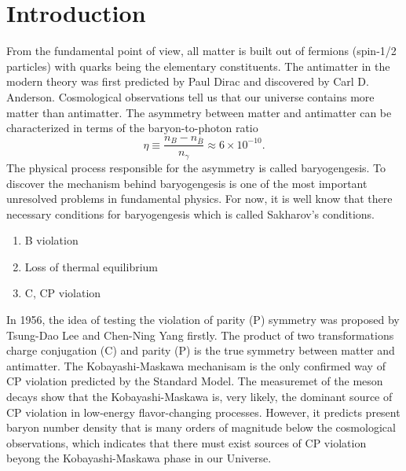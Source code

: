 \section{Introduction}

From the fundamental point of view, all matter is built out of fermions (spin-1/2 particles) 
with quarks being the elementary constituents. The antimatter in the modern theory was first 
predicted by Paul Dirac and discovered by Carl D. Anderson. Cosmological observations tell us
that our universe contains more matter than antimatter. The asymmetry between matter and 
antimatter can be characterized in terms of the baryon-to-photon ratio
\begin{equation}
	\eta \equiv \frac{n_{B} - n_{\bar{B}}}{n_{\gamma}} \approx 6\times10^{-10}.
\end{equation}
The physical process responsible for the asymmetry is called baryogengesis. To discover
the mechanism behind baryogengesis is one of the most important unresolved problems in 
fundamental physics. For now, it is well know that there necessary conditions for 
baryogengesis which is called Sakharov's conditions.
\begin{enumerate}
	\item B violation
	\item Loss of thermal equilibrium
	\item C, CP violation
\end{enumerate}

In 1956, the idea of testing the violation of parity (P) symmetry was proposed by 
Tsung-Dao Lee and Chen-Ning Yang firstly. The product of two transformations
charge conjugation (C) and parity (P) is the true symmetry between matter and 
antimatter. The Kobayashi-Maskawa mechanisam is the only confirmed way of CP violation predicted
by the Standard Model. The measuremet of the meson decays show that the Kobayashi-Maskawa
is, very likely, the dominant source of CP violation in low-energy flavor-changing 
processes. However, it predicts present baryon number density that is many orders of
magnitude below the cosmological observations, which indicates that there must exist
sources of CP violation beyong the Kobayashi-Maskawa phase in our Universe.

